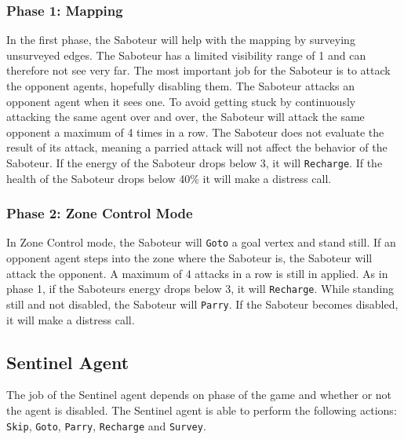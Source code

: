 \documentclass[11pt]{article}
\begin{document}
\subsubsection*{Phase 1: Mapping}
In the first phase, the Saboteur will help with the mapping by surveying unsurveyed edges. The Saboteur has a limited visibility range of 1 and can therefore not see very far. The most important job for the Saboteur is to attack the opponent agents, hopefully disabling them. The Saboteur attacks an opponent agent when it sees one. To avoid getting stuck by continuously attacking the same agent over and over, the Saboteur will attack the same opponent a maximum of 4 times in a row. The Saboteur does not evaluate the result of its attack, meaning a parried attack will not affect the behavior of the Saboteur. If the energy of the Saboteur drops below 3, it will {\tt Recharge}. If the health of the Saboteur drops below 40\% it will make a distress call.

\subsubsection*{Phase 2: Zone Control Mode}
In Zone Control mode, the Saboteur will {\tt Goto} a goal vertex and stand still. If an opponent agent steps into the zone where the Saboteur is, the Saboteur will attack the opponent. A maximum of 4 attacks in a row is still in applied. As in phase 1, if the Saboteurs energy drops below 3, it will {\tt Recharge}. While standing still and not disabled, the Saboteur will {\tt Parry}. If the Saboteur becomes disabled, it will make a distress call.

\subsection{Sentinel Agent}
The job of the Sentinel agent depends on phase of the game and whether or not the agent is disabled. The Sentinel agent is able to perform the following actions: {\tt Skip}, {\tt Goto}, {\tt Parry}, {\tt Recharge} and {\tt Survey}.
\end{document}
